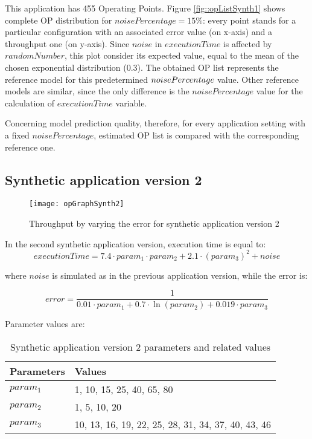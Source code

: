 This application has 455 Operating Points. Figure \ref{fig::opListSynth1} shows complete OP distribution for $noisePercentage = 15\%$: every point stands for a particular configuration with an associated error value (on x-axis) and a throughput one (on y-axis). Since $noise$ in $executionTime$ is affected by $randomNumber$, this plot consider its expected value, equal to the mean of the chosen exponential distribution (0.3). The obtained OP list represents the reference model for this predetermined $noise\-Per\-cent\-age$ value. Other reference models are similar, since the only difference is the $noisePercentage$ value for the calculation of $executionTime$ variable.

Concerning model prediction quality, therefore, for every application setting with a fixed $noisePercentage$, estimated OP list is compared with the corresponding reference one.


\subsection{Synthetic application version 2}

\begin{figure}[h	]

    \centering
    \texttt{[image: opGraphSynth2]}
    \caption{Throughput by varying the error for synthetic application version 2}
    \label{fig::opListSynth2}
    
\end{figure}

In the second synthetic application version, execution time is equal to:
\[
executionTime = 7.4 \cdot param_1 \cdot param_2 + 2.1 \cdot (param_3)^2 + noise
\]

where $noise$ is simulated as in the previous application version, while the error is:

\[
error = \dfrac{1}{0.01 \cdot param_1 + 0.7 \cdot \ln{(param_2)} + 0.019 \cdot param_3}
\]

Parameter values are:

\begin{table}[H]

    \centering

    \begin{tabular}{ll}
    
        \toprule
        Parameters & Values \\
        \midrule
        $param_1$ & 1, 10, 15, 25, 40, 65, 80 \\
        $param_2$ & 1, 5, 10, 20 \\
        $param_3$ & 10, 13, 16, 19, 22, 25, 28, 31, 34, 37, 40, 43, 46 \\
        \bottomrule 
    
    \end{tabular}

    \caption{Synthetic application version 2 parameters and related values}

\end{table}


